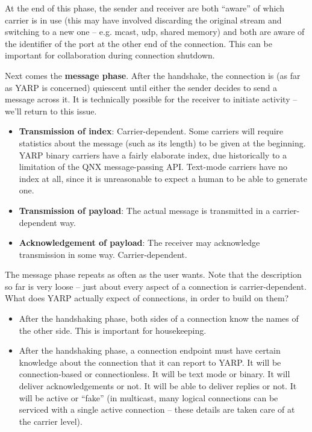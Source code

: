 At the end of this phase, the sender and receiver are both ``aware''
of which carrier is in use (this may have involved discarding the
original stream and switching to a new one -- e.g. mcast, udp, shared
memory) and both are aware of the identifier of the port at the
other end of the connection.  This can be important for collaboration
during connection shutdown.


Next comes the {\bf message phase}.
After the handshake, the connection is (as far as YARP is concerned)
quiescent until either the sender decides to send a message across it.
It is technically possible for the receiver to initiate activity --
we'll return to this issue.

\begin{itemize} \pflist

\item {\bf Transmission of index}: Carrier-dependent. Some carriers
will require statistics about the message (such as its length) to be
given at the beginning.  YARP binary carriers have a fairly elaborate
index, due historically to a limitation of the QNX message-passing
API.  Text-mode carriers have no index at all, since it is
unreasonable to expect a human to be able to generate one.

\item {\bf Transmission of payload}: The actual message is
transmitted in a carrier-dependent way.

\item {\bf Acknowledgement of payload}: The receiver may 
acknowledge transmission in some way.  Carrier-dependent.

\end{itemize}

The message phase repeats as often as the user wants.
%
Note that the description so far is very loose -- just about every aspect
of a connection is carrier-dependent.  What does YARP actually
expect of connections, in order to build on them?

\begin{itemize} \pflist

\item After the handshaking phase, both sides of a connection know the
names of the other side.  This is important for housekeeping.

\item After the handshaking phase, a connection endpoint must have
certain knowledge about the connection that it can report to YARP.  It
will be connection-based or connectionless.  It will be text mode or
binary.  It will deliver acknowledgements or not.  It will be able to
deliver replies or not.  It will be active or ``fake'' (in multicast,
many logical connections can be serviced with a single active
connection -- these details are taken care of at the carrier level).

\end{itemize}


